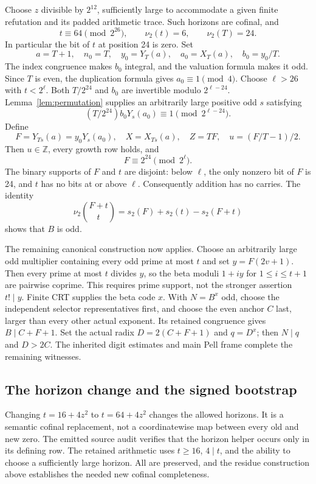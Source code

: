 \documentclass[10pt,letterpaper]{article}
\theoremstyle{remark}\newtheorem{remark}[theorem]{Remark}
\newcommand{\Z}{\mathbb Z}\newcommand{\N}{\mathbb N}
\newcommand{\vp}{\nu_2}
\begin{document}
Choose $z$ divisible by $2^{12}$, sufficiently large to accommodate a
given finite refutation and its padded arithmetic trace. Such horizons
are cofinal, and
\[
 t\equiv64\pmod{2^{26}},\qquad \vp(t)=6,
 \qquad \vp(T)=24.
\]
In particular the bit of $t$ at position 24 is zero. Set
\[
 a=T+1,\quad n_0=T,\quad y_0=Y_T(a),\quad a_0=X_T(a),
 \quad b_0=y_0/T.
\]
The index congruence makes $b_0$ integral, and the valuation formula makes
it odd. Since $T$ is even, the duplication formula gives $a_0\equiv1\pmod4$.
Choose $\ell>26$ with $t<2^\ell$. Both $T/2^{24}$ and $b_0$ are
invertible modulo $2^{\ell-24}$. Lemma~\ref{lem:permutation} supplies an
arbitrarily large positive odd $s$ satisfying
\[
 (T/2^{24})b_0Y_s(a_0)\equiv1\pmod{2^{\ell-24}}.
\]
Define
\[
 F=Y_{Ts}(a)=y_0Y_s(a_0),\quad X=X_{Ts}(a),\quad Z=TF,
 \quad u=(F/T-1)/2.
\]
Then $u\in\Z$, every growth row holds, and
\begin{equation}\label{eq:targetresidue}
 F\equiv2^{24}\pmod{2^\ell}.
\end{equation}
The binary supports of $F$ and $t$ are disjoint: below $\ell$, the only
nonzero bit of $F$ is 24, and $t$ has no bits at or above $\ell$.
Consequently addition has no carries. The identity
\[
 \vp\binom{F+t}{t}=s_2(F)+s_2(t)-s_2(F+t)
\]
shows that $B$ is odd.

The remaining canonical construction now applies. Choose an arbitrarily
large odd multiplier containing every odd prime at most $t$ and set
$y=F(2v+1)$. Then every prime at most $t$ divides $y$, so the beta moduli
$1+iy$ for $1\le i\le t+1$ are pairwise coprime. This requires prime
support, not the stronger assertion $t!\mid y$. Finite CRT supplies the
beta code $x$. With $N=B^x$ odd, choose the independent selector
representatives first, and choose the even anchor $C$ last, larger than
every other actual exponent. Its retained congruence gives
$B\mid C+F+1$. Set the actual radix $D=2(C+F+1)$ and $q=D^x$;
then $N\mid q$ and $D>2C$. The inherited digit estimates and main Pell
frame complete the remaining witnesses.

\subsection{The horizon change and the signed bootstrap}

Changing $t=16+4z^2$ to $t=64+4z^2$ changes the allowed horizons. It is
a semantic cofinal replacement, not a coordinatewise map between every
old and new zero. The emitted source audit verifies that the horizon
helper occurs only in its defining row. The retained arithmetic uses
$t\ge16$, $4\mid t$, and the ability to choose a sufficiently large
horizon. All are preserved, and the residue construction above establishes
the needed new cofinal completeness.
\end{document}
